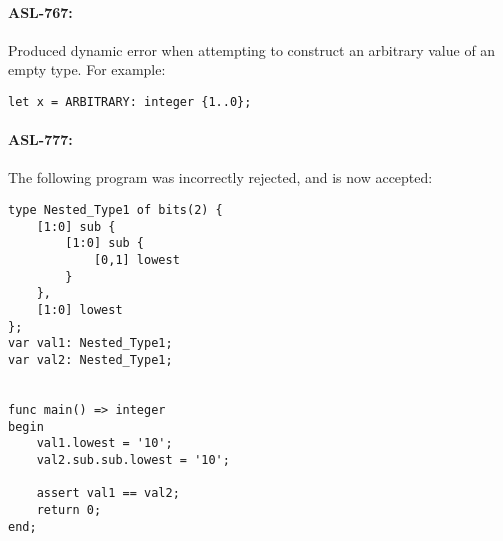 \paragraph{ASL-767: }
Produced dynamic error when attempting to construct an arbitrary value of an empty type.
For example:
\begin{verbatim}
let x = ARBITRARY: integer {1..0};
\end{verbatim}

\paragraph{ASL-777: }
The following program was incorrectly rejected, and is now accepted:
\begin{verbatim}
type Nested_Type1 of bits(2) {
    [1:0] sub {
        [1:0] sub {
            [0,1] lowest
        }
    },
    [1:0] lowest
};
var val1: Nested_Type1;
var val2: Nested_Type1;


func main() => integer
begin
    val1.lowest = '10';
    val2.sub.sub.lowest = '10';

    assert val1 == val2;
    return 0;
end;
\end{verbatim}
